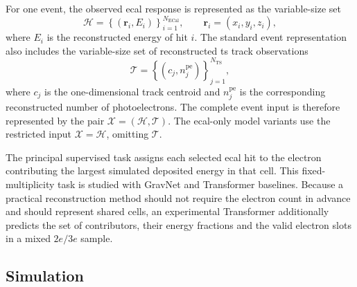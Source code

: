 For one event, the observed \gls{ecal} response is represented as the
variable-size set
\begin{equation}
    \mathcal{H} =
    \left\{
    \left(\boldsymbol{r}_i,E_i\right)
    \right\}_{i=1}^{N_{\mathrm{ECal}}},
    \qquad
    \boldsymbol{r}_i=(x_i,y_i,z_i),
\end{equation}
where \(E_i\) is the reconstructed energy of hit \(i\). The standard event
representation also includes the variable-size set of
reconstructed \gls{ts} track observations
\begin{equation}
    \mathcal{T} =
    \left\{
    \left(c_j,n^{\mathrm{pe}}_j\right)
    \right\}_{j=1}^{N_{\mathrm{TS}}},
\end{equation}
where \(c_j\) is the one-dimensional track centroid and
\(n^{\mathrm{pe}}_j\) is the corresponding reconstructed number of
photoelectrons. The complete event input is therefore represented by the pair
\(\mathcal{X}=(\mathcal{H},\mathcal{T})\). The \gls{ecal}-only model variants
use the restricted input \(\mathcal{X}=\mathcal{H}\), omitting
    \(\mathcal{T}\).

The principal supervised task assigns each selected \gls{ecal} hit to the
electron contributing the largest simulated deposited energy in that cell.
This fixed-multiplicity task is studied with GravNet and Transformer baselines.
Because a practical reconstruction method should not require the electron
count in advance and should represent shared cells, an experimental
Transformer additionally predicts the set of contributors, their energy
fractions and the valid electron slots in a mixed \(2e/3e\) sample.

\subsection{Simulation}

